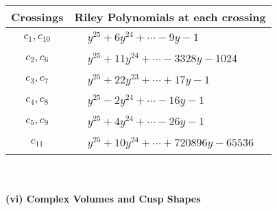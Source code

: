 \documentclass[1p]{elsarticle_modified}
\theoremstyle{definition}
\begin{document}
\begin{tabular}{m{50pt}|m{274pt}}
Crossings & \hspace{64pt}Riley Polynomials at each crossing \\
\hline $$\begin{aligned}c_{1},c_{10}\end{aligned}$$&$\begin{aligned}
&y^{25}+6 y^{24}+\cdots-9 y-1
\end{aligned}$\\
\hline $$\begin{aligned}c_{2},c_{6}\end{aligned}$$&$\begin{aligned}
&y^{25}+11 y^{24}+\cdots-3328 y-1024
\end{aligned}$\\
\hline $$\begin{aligned}c_{3},c_{7}\end{aligned}$$&$\begin{aligned}
&y^{25}+22 y^{23}+\cdots+17 y-1
\end{aligned}$\\
\hline $$\begin{aligned}c_{4},c_{8}\end{aligned}$$&$\begin{aligned}
&y^{25}-2 y^{24}+\cdots-16 y-1
\end{aligned}$\\
\hline $$\begin{aligned}c_{5},c_{9}\end{aligned}$$&$\begin{aligned}
&y^{25}+4 y^{24}+\cdots-26 y-1
\end{aligned}$\\
\hline $$\begin{aligned}c_{11}\end{aligned}$$&$\begin{aligned}
&y^{25}+10 y^{24}+\cdots+720896 y-65536
\end{aligned}$\\
\hline
\end{tabular}\\~\\
\newpage\flushleft \textbf{(vi) Complex Volumes and Cusp Shapes}
\end{document}
